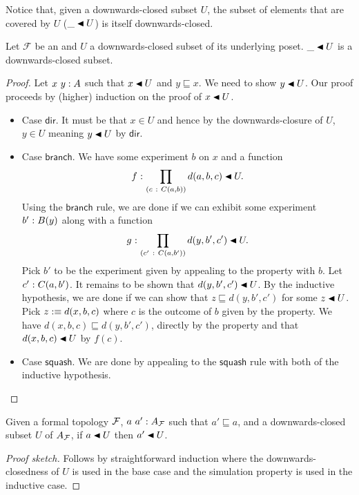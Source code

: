 Notice that, given a downwards-closed subset $U$, the subset of elements that are covered
by $U$ ($\covers{\_}{U}$) is itself downwards-closed.
\begin{prop}
  Let $\mathcal{F}$ be an \verintrsys{} and $U$ a downwards-closed subset of its
  underlying poset. $\covers{\_}{U}$ is a downwards-closed subset.
\end{prop}
\begin{proof}
  Let $x~y:A$ such that $\covers{x}{U}$ and $y \sqsubseteq x$. We need to show
  $\covers{y}{U}$. Our proof proceeds by (higher) induction on the proof of
  $\covers{x}{U}$.
  \begin{itemize}
    \item Case $\mathsf{dir}$. It must be that $x \in U$ and hence by the downwards-closure
      of $U$, $y \in U$ meaning $\covers{y}{U}$ by $\mathsf{dir}$.
    \item Case $\mathsf{branch}$. We have some experiment $b$ on $x$ and a function
      $$\oftyI{f}{\pity{c}{C(a, b)}{\covers{d(a, b, c)}{U}}}.$$
      Using the $\mathsf{branch}$ rule, we are done if we can exhibit some experiment
      $b'\hspace{0.1mm}:\hspace{0.1mm}B(y)$ along with a function
      $$\oftyI{g}{\pity{c'}{C(a, b')}{\covers{d(y, b', c')}{U}}}.$$
      Pick $b'$ to be the experiment given by appealing to the \versim{} property with
      $b$. Let $c'\hspace{0.1mm}:\hspace{0.1mm}C(a, b')$. It remains to be shown that $\covers{d(y, b', c')}{U}$.
      By the inductive hypothesis, we are done if we can show that $z \sqsubseteq d(y, b', c')$
      for some $\covers{z}{U}$. Pick $z :\equiv d(x, b, c)$ where $c$ is the outcome of $b$ given
      by the \versim{} property. We have $d(x, b, c) \sqsubseteq d(y, b', c')$, directly by the
      \versim{} property and that $\covers{d(x, b, c)}{U}$ by $f(c)$.
    \item Case $\mathsf{squash}$. We are done by appealing to the $\mathsf{squash}$ rule
      with both of the inductive hypothesis.
  \end{itemize}
\end{proof}

\begin{prop}\label{prop:lem1}
  Given a formal topology $\mathcal{F}{}$, $a~a':A_{\mathcal{F}{}}$ such that $a' \sqsubseteq a$, and a
  downwards-closed subset $U$ of $A_{\mathcal{F}{}}$, if $\covers{a}{U}$ then $\covers{a'}{U}$.
\end{prop}
\begin{proof}[Proof sketch]
  Follows by straightforward induction where the downwards-closedness of $U$ is used
  in the base case and the simulation property is used in the inductive case.
\end{proof}

